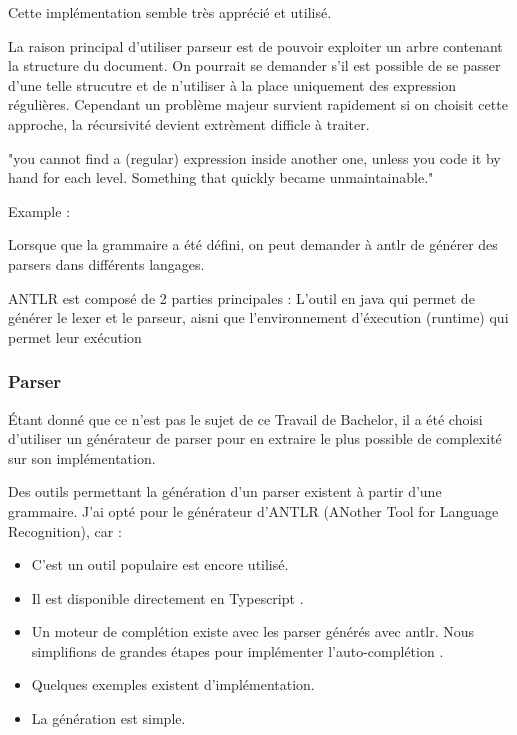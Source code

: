 \documentclass[
    iict, %
    il, %
]{heig-tb}
\begin{document}


Cette implémentation semble très apprécié et utilisé.

La raison principal d'utiliser parseur est de pouvoir exploiter un arbre contenant la structure du document.
On pourrait se demander s'il est possible de se passer d'une telle strucutre et de n'utiliser à la place uniquement des expression régulières.
Cependant un problème majeur survient rapidement si on choisit cette approche, la récursivité devient extrèment difficle à traiter.

"you cannot find a (regular) expression inside another one, unless you code it by hand for each level. Something that quickly became unmaintainable."

Example : %

Lorsque que la grammaire a été défini, on peut demander à antlr de générer des parsers dans différents langages.

ANTLR est composé de 2 parties principales : L'outil en java qui permet de générer le lexer et le parseur, aisni que l'environnement d'éxecution (runtime) qui permet leur exécution



\subsubsection{Parser}
Étant donné que ce n'est pas le sujet de ce Travail de Bachelor, il a été choisi d'utiliser un générateur de parser pour en extraire le plus possible de complexité sur son implémentation.

Des outils permettant la génération d'un parser existent à partir d'une grammaire.
J'ai opté pour le générateur d'ANTLR (ANother Tool for Language Recognition), car :

\begin{itemize}
    \item C'est un outil populaire est encore utilisé.
    \item Il est disponible directement en Typescript \cite{antlr4ts}.
    \item Un moteur de complétion existe avec les parser générés avec antlr. Nous simplifions de grandes étapes pour implémenter l'auto-complétion \cite{antlr4-c3}.
    \item Quelques exemples existent d'implémentation.
    \item La génération est simple.
\end{itemize}
\end{document}
